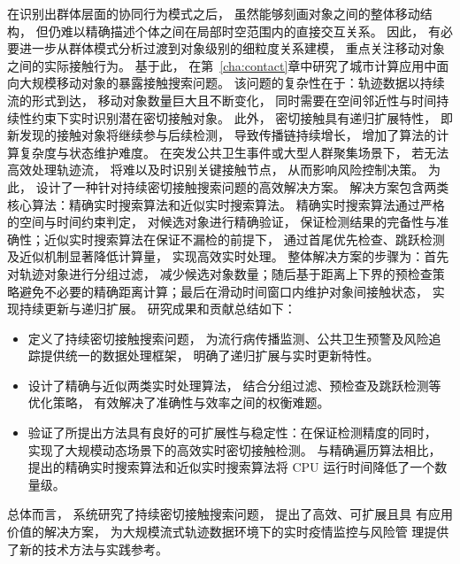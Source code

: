 在识别出群体层面的协同行为模式之后， 虽然能够刻画对象之间的整体移动结构， 但仍难以精确描述个体之间在局部时空范围内的直接交互关系。 因此， 有必要进一步从群体模式分析过渡到对象级别的细粒度关系建模， 重点关注移动对象之间的实际接触行为。 基于此， 在第~\ref{cha:contact}章中研究了城市计算应用中面向大规模移动对象的暴露接触搜索问题。 该问题的复杂性在于：轨迹数据以持续流的形式到达， 移动对象数量巨大且不断变化， 同时需要在空间邻近性与时间持续性约束下实时识别潜在密切接触对象。 此外， 密切接触具有递归扩展特性， 即新发现的接触对象将继续参与后续检测， 导致传播链持续增长， 增加了算法的计算复杂度与状态维护难度。 在突发公共卫生事件或大型人群聚集场景下， 若无法高效处理轨迹流， 将难以及时识别关键接触节点， 从而影响风险控制决策。 为此， 设计了一种针对持续密切接触搜索问题的高效解决方案。 解决方案包含两类核心算法：精确实时搜索算法和近似实时搜索算法。 精确实时搜索算法通过严格的空间与时间约束判定， 对候选对象进行精确验证， 保证检测结果的完备性与准确性；近似实时搜索算法在保证不漏检的前提下， 通过首尾优先检查、跳跃检测及近似机制显著降低计算量， 实现高效实时处理。 整体解决方案的步骤为：首先对轨迹对象进行分组过滤， 减少候选对象数量；随后基于距离上下界的预检查策略避免不必要的精确距离计算；最后在滑动时间窗口内维护对象间接触状态， 实现持续更新与递归扩展。 研究成果和贡献总结如下：
\begin{itemize}
    \item 定义了持续密切接触搜索问题， 为流行病传播监测、公共卫生预警及风险追踪提供统一的数据处理框架， 明确了递归扩展与实时更新特性。
    \item 设计了精确与近似两类实时处理算法， 结合分组过滤、预检查及跳跃检测等优化策略， 有效解决了准确性与效率之间的权衡难题。
    \item 验证了所提出方法具有良好的可扩展性与稳定性：在保证检测精度的同时， 实现了大规模动态场景下的高效实时密切接触检测。 与精确遍历算法相比， 提出的精确实时搜索算法和近似实时搜索算法将 CPU 运行时间降低了一个数量级。
\end{itemize}
总体而言， 系统研究了持续密切接触搜索问题， 提出了高效、可扩展且具
有应用价值的解决方案， 为大规模流式轨迹数据环境下的实时疫情监控与风险管
理提供了新的技术方法与实践参考。



